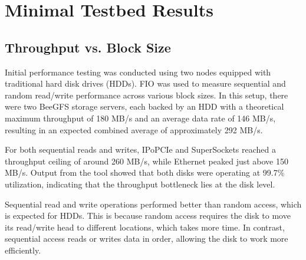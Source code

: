 \section{Minimal Testbed Results}

\subsection{Throughput vs. Block Size}

Initial performance testing was conducted using two nodes equipped with traditional hard disk drives (HDDs). FIO was used to measure sequential and random read/write performance across various block sizes. In this setup, there were two BeeGFS storage servers, each backed by an HDD with a theoretical maximum throughput of 180 MB/s and an average data rate of 146 MB/s, resulting in an expected combined average of approximately 292 MB/s.

For both sequential reads and writes, IPoPCIe and SuperSockets reached a throughput ceiling of around 260 MB/s, while Ethernet peaked just above 150 MB/s. Output from the  tool showed that both disks were operating at 99.7\% utilization, indicating that the throughput bottleneck lies at the disk level.

Sequential read and write operations performed better than random access, which is expected for HDDs. This is because random access requires the disk to move its read/write head to different locations, which takes more time. In contrast, sequential access reads or writes data in order, allowing the disk to work more efficiently.

